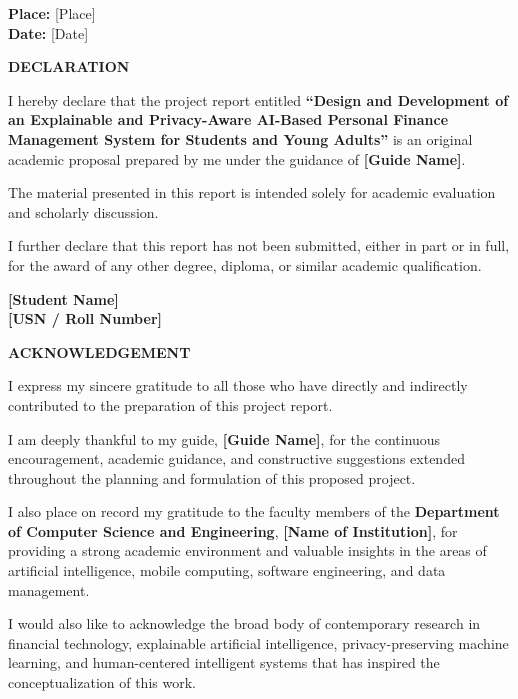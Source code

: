 \documentclass[12pt,a4paper]{report}
\newcommand{\ReportTitle}{Design and Development of an Explainable and Privacy-Aware AI-Based Personal Finance Management System for Students and Young Adults}
\newcommand{\StudentName}{[Student Name]}
\newcommand{\USN}{[USN / Roll Number]}
\newcommand{\DepartmentName}{Department of Computer Science and Engineering}
\newcommand{\CollegeName}{[Name of Institution]}
\newcommand{\GuideName}{[Guide Name]}
\begin{document}
\vspace{2cm}
\textbf{Place:} [Place]\\
\textbf{Date:} [Date]

\cleardoublepage
\thispagestyle{empty}
\begin{center}
{\Large \textbf{DECLARATION}}\\[1cm]
\end{center}

\justifying
I hereby declare that the project report entitled
\textbf{``\ReportTitle''}
is an original academic proposal prepared by me under the guidance of
\textbf{\GuideName}.

The material presented in this report is intended solely for academic evaluation and scholarly discussion.

I further declare that this report has not been submitted, either in part or in full, for the award of any other degree, diploma, or similar academic qualification.

\vspace{2cm}
\begin{flushright}
\textbf{\StudentName}\\
\textbf{\USN}
\end{flushright}

\cleardoublepage
\thispagestyle{empty}
\begin{center}
{\Large \textbf{ACKNOWLEDGEMENT}}\\[1cm]
\end{center}

\justifying
I express my sincere gratitude to all those who have directly and indirectly contributed to the preparation of this project report.

I am deeply thankful to my guide,
\textbf{\GuideName},
for the continuous encouragement, academic guidance, and constructive suggestions extended throughout the planning and formulation of this proposed project.

I also place on record my gratitude to the faculty members of the
\textbf{\DepartmentName},
\textbf{\CollegeName},
for providing a strong academic environment and valuable insights in the areas of artificial intelligence, mobile computing, software engineering, and data management.

I would also like to acknowledge the broad body of contemporary research in financial technology, explainable artificial intelligence, privacy-preserving machine learning, and human-centered intelligent systems that has inspired the conceptualization of this work.
\end{document}
